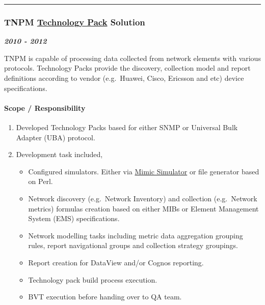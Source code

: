 \documentclass[
]{article}
\providecommand{\tightlist}{%
  \setlength{\itemsep}{0pt}\setlength{\parskip}{0pt}}
\begin{document}
\begin{center}\rule{0.5\linewidth}{0.5pt}\end{center}

\hypertarget{tnpm-technology-pack-solution}{%
\subsubsection{\texorpdfstring{TNPM
\href{http://www.ibm.com/support/knowledgecenter/SSBNJ7_1.4.0/com.ibm.tnpm_tp14D.doc/pack_install_config/ctnpm_tpinstall_introduction_modify_1.html}{Technology
Pack}
Solution}{TNPM Technology Pack Solution}}\label{tnpm-technology-pack-solution}}

\textbf{\emph{2010 - 2012}}

TNPM is capable of processing data collected from network elements with
various protocols. Technology Packs provide the discovery, collection
model and report definitions according to vendor (e.g.~Huawei, Cisco,
Ericsson and etc) device specifications.

\hypertarget{scope-responsibility-13}{%
\paragraph{Scope / Responsibility}\label{scope-responsibility-13}}

\begin{enumerate}
\def\labelenumi{\arabic{enumi}.}
\tightlist
\item
  Developed Technology Packs based for either SNMP or Universal Bulk
  Adapter (UBA) protocol.
\item
  Development task included,

  \begin{itemize}
  \tightlist
  \item
    Configured simulators. Either via
    \href{http://www.gambitcomm.com/site/products/mimic_simulator.shtml}{Mimic
    Simulator} or file generator based on Perl.
  \item
    Network discovery (e.g.~Network Inventory) and collection
    (e.g.~Network metrics) formulas creation based on either MIBs or
    Element Management System (EMS) specifications.
  \item
    Network modelling tasks including metric data aggregation grouping
    rules, report navigational groups and collection strategy groupings.
  \item
    Report creation for DataView and/or Cognos reporting.
  \item
    Technology pack build process execution.
  \item
    BVT execution before handing over to QA team.
  \end{itemize}
\end{enumerate}
\end{document}
